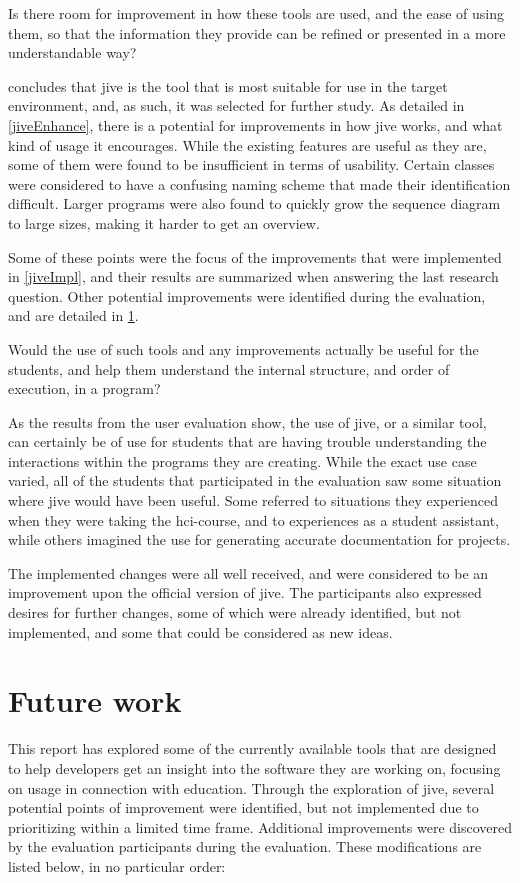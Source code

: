 \begin{theorem}
Is there room for improvement in how these tools are used, and the ease of using them, so that the information they provide can be refined or presented in a more understandable way?
\end{theorem}
 concludes that \gls{jive} is the tool that is most suitable for use in the target environment, and, as such, it was selected for further study.
As detailed in \cref{jiveEnhance}, there is a potential for improvements in how \gls{jive} works, and what kind of usage it encourages.
While the existing features are useful as they are, some of them were found to be insufficient in terms of usability.
Certain classes were considered to have a confusing naming scheme that made their identification difficult.
Larger programs were also found to quickly grow the sequence diagram to large sizes, making it harder to get an overview.

Some of these points were the focus of the improvements that were implemented in \cref{jiveImpl}, and their results are summarized when answering the last research question.
Other potential improvements were identified during the evaluation, and are detailed in \cref{conclusionFuture}.

\begin{theorem}
Would the use of such tools and any improvements actually be useful for the students, and help them understand the internal structure, and order of execution, in a program?
\end{theorem}
As the results from the user evaluation show, the use of \gls{jive}, or a similar tool, can certainly be of use for students that are having trouble understanding the interactions within the programs they are creating.
While the exact use case varied, all of the students that participated in the evaluation saw some situation where \gls{jive} would have been useful.
Some referred to situations they experienced when they were taking the \gls{hci}-course, and to experiences as a student assistant, while others imagined the use for generating accurate documentation for projects.

The implemented changes were all well received, and were considered to be an improvement upon the official version of \gls{jive}.
The participants also expressed desires for further changes, some of which were already identified, but not implemented, and some that could be considered as new ideas.

\section{Future work}\label{conclusionFuture}
This report has explored some of the currently available tools that are designed to help developers get an insight into the software they are working on, focusing on usage in connection with education.
Through the exploration of \gls{jive}, several potential points of improvement were identified, but not implemented due to prioritizing within a limited time frame.
Additional improvements were discovered by the evaluation participants during the evaluation.
These modifications are listed below, in no particular order:

